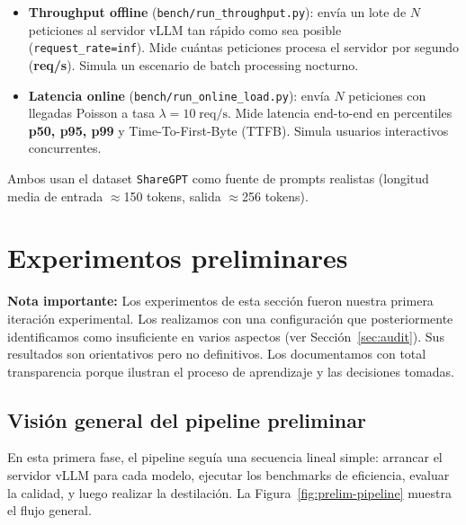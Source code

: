 \documentclass[11pt,a4paper]{article}
\begin{document}
\begin{itemize}[leftmargin=2em]
  \item \textbf{Throughput offline} (\texttt{bench/run\_throughput.py}):
    env\'ia un lote de $N$ peticiones al servidor vLLM tan r\'apido
    como sea posible (\texttt{request\_rate=inf}). Mide cu\'antas
    peticiones procesa el servidor por segundo (\textbf{req/s}). Simula
    un escenario de batch processing nocturno.

  \item \textbf{Latencia online} (\texttt{bench/run\_online\_load.py}):
    env\'ia $N$ peticiones con llegadas Poisson a tasa
    $\lambda=10\;\text{req/s}$. Mide latencia end-to-end en percentiles
    \textbf{p50, p95, p99} y Time-To-First-Byte (TTFB). Simula
    usuarios interactivos concurrentes.
\end{itemize}

Ambos usan el dataset \texttt{ShareGPT} como fuente de prompts realistas
(longitud media de entrada $\approx$150 tokens, salida $\approx$256 tokens).

\section{Experimentos preliminares}
\label{sec:preliminary}

\begin{warningbox}
\textbf{Nota importante:} Los experimentos de esta secci\'on fueron
nuestra primera iteraci\'on experimental. Los realizamos con una
configuraci\'on que posteriormente identificamos como insuficiente en
varios aspectos (ver Secci\'on~\ref{sec:audit}). Sus resultados son
orientativos pero no definitivos. Los documentamos con total
transparencia porque ilustran el proceso de aprendizaje y las
decisiones tomadas.
\end{warningbox}

\subsection{Visi\'on general del pipeline preliminar}

En esta primera fase, el pipeline segu\'ia una secuencia lineal simple:
arrancar el servidor vLLM para cada modelo, ejecutar los benchmarks de
eficiencia, evaluar la calidad, y luego realizar la destilaci\'on. La
Figura~\ref{fig:prelim-pipeline} muestra el flujo general.
\end{document}
